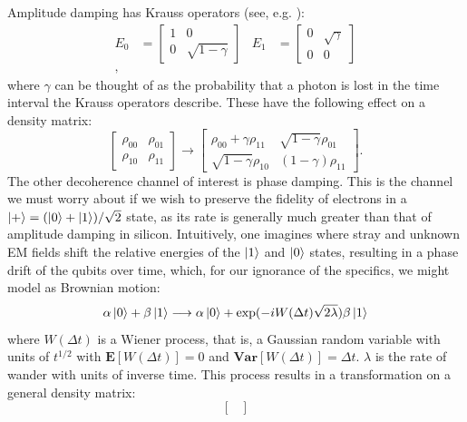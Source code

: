 \documentclass{report}
\begin{document}
\begin{appendices}
Amplitude damping has Krauss operators (see, e.g. \cite{Nielsen2010}):
\begin{align*}
E_0 &= \begin{bmatrix}
1 & 0\\
0 & \sqrt{1-\gamma} 
\end{bmatrix}   &   E_1 &= \begin{bmatrix}
0 & \sqrt{\gamma}\\
0 & 0 
\end{bmatrix}\\,
\end{align*}
where $\gamma$ can be thought of as the probability that a photon is lost in the time interval the Krauss operators describe. These have the following effect on a density matrix:
\begin{equation*}
    \begin{bmatrix}
        \rho_{00} & \rho_{01} \\ \rho_{10} & \rho_{11}
    \end{bmatrix}
    \longrightarrow
    \begin{bmatrix}
        \rho_{00} + \gamma \rho_{11} & \sqrt{1-\gamma} \rho_{01} \\ \sqrt{1-\gamma} \rho_{10} & (1-\gamma) \rho_{11}
    \end{bmatrix}.
\end{equation*}
The other decoherence channel of interest is phase damping. This is the channel we must worry about if we wish to preserve the fidelity of electrons in a $\ket{+} = (\ket{0} + \ket{1})/\sqrt{2}$ state, as its rate is generally much greater than that of amplitude damping in silicon. Intuitively, one imagines where stray and unknown EM fields shift the relative energies of the $\ket{1}$ and $\ket{0}$ states, resulting in a phase drift of the qubits over time, which, for our ignorance of the specifics, we might model as Brownian motion:
\begin{equation*}
\alpha\ket{0} + \beta\ket{1} \longrightarrow \alpha\ket{0} + \exp(-i W(\Delta t) \sqrt{2\lambda}) \beta\ket{1}
\end{equation*}
where $W(\Delta t)$ is a Wiener process, that is, a Gaussian random variable with units of $t^{1/2}$ with $\mathbf{E}[W(\Delta t)] = 0$ and $\mathbf{Var}[W(\Delta t)] = \Delta t$. $\lambda$ is the rate of wander with units of inverse time. This process results in a transformation on a general density matrix:
\begin{equation} \label{eq:phasedamptrans}
    \begin{bmatrix}

\end{bmatrix}
\end{equation}
\end{appendices}
\end{document}
